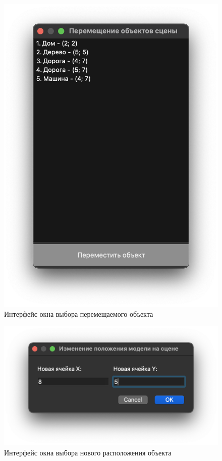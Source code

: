 \documentclass[a4paper,14pt, unknownkeysallowed]{extreport}
\begin{document}
\begin{figure}[h]
	\centering
	\includegraphics[scale=0.57]{img/change1.png}
	\caption{Интерфейс окна выбора перемещаемого объекта}
	\label{fig:change1}
\end{figure} 

\begin{figure}[h]
	\centering
	\includegraphics[scale=0.56]{img/change2.png}
	\caption{Интерфейс окна выбора нового расположения объекта}
	\label{fig:change2}
\end{figure} 
\end{document}
